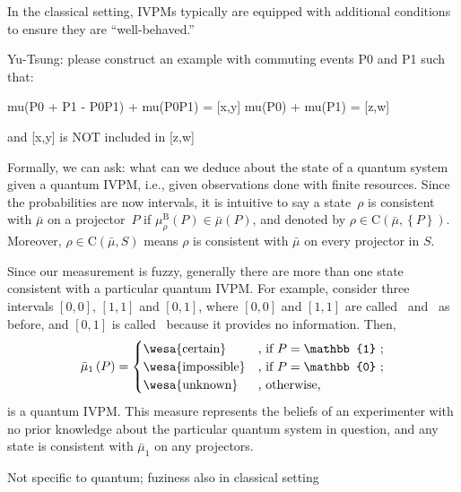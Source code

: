 \documentclass[english,reprint, aps, prl,superscriptaddress, showpacs,
showkeys, longbibliography, amsmath, amssymb]{revtex4-1}
\theoremstyle{plain}
\theoremstyle{definition}
\newcommand{\imposs}{{\text{\wesa{impossible}}}}
\newcommand{\necess}{{\text{\wesa{certain}}}}
\newcommand{\unknown}{{\text{\wesa{unknown}}}}
\newcommand{\coreBorn}{\ensuremath{\mathrm{C}}}
\begin{document}
In the classical setting, IVPMs typically are equipped with additional
conditions to ensure they are ``well-behaved.''

Yu-Tsung: please construct an example with commuting events P0 and P1 such that:

mu(P0 + P1 - P0P1) + mu(P0P1) = [x,y]
mu(P0) + mu(P1) = [z,w]

and [x,y] is NOT included in [z,w]



Formally, we can ask: what can we deduce about the state of a quantum
system given a quantum IVPM, i.e., given observations done with finite
resources. Since the probabilities are now intervals, it is intuitive
to say a state~$\rho$ is consistent with $\bar{\mu}$ on a projector~$P$
if $\mu_{\rho}^{\mathrm{B}}\left(P\right)\in\bar{\mu}\left(P\right)$,
and denoted by $\rho\in\coreBorn\left(\bar{\mu},\left\{ P\right\} \right)$.
Moreover, $\rho\in\coreBorn\left(\bar{\mu},S\right)$ means $\rho$
is consistent with $\bar{\mu}$ on every projector in $S$. 

Since our measurement is fuzzy, generally there are more than one
state consistent with a particular quantum IVPM. For example, consider
three intervals $\left[0,0\right]$, $\left[1,1\right]$ and \emph{$\left[0,1\right]$},
where $\left[0,0\right]$ and $\left[1,1\right]$ are called \imposs~and
\necess~as before, and \emph{$\left[0,1\right]$} is called \unknown~because
it provides no information. Then,
\begin{equation}
\bar{\mu}_{1}\left(P\right)=\begin{cases}
\necess & \text{, if }P=\mathbb{1}\text{ ;}\\
\imposs & \text{, if }P=\mathbb{0}\text{ ;}\\
\unknown & \text{, otherwise,}
\end{cases}\label{eq:no-information-IVPM}
\end{equation}
is a quantum IVPM. This measure represents the beliefs of an experimenter
with no prior knowledge about the particular quantum system in question,
and any state is consistent with $\bar{\mu}_{1}$ on any projectors.

Not specific to quantum; fuziness also in classical setting
\end{document}
